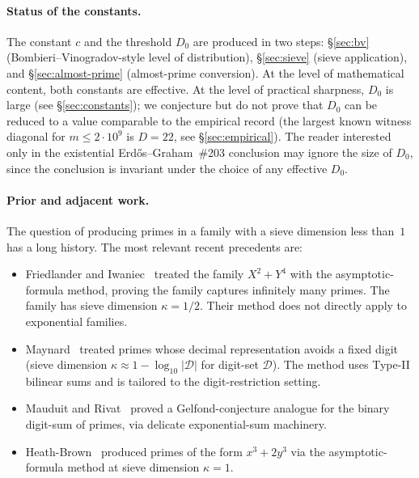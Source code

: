 \paragraph{Status of the constants.}
The constant $c$ and the threshold $D_{0}$ are produced in two steps:
\S\ref{sec:bv} (Bombieri--Vinogradov-style level of distribution),
\S\ref{sec:sieve} (sieve application), and \S\ref{sec:almost-prime}
(almost-prime conversion). At the level of mathematical content, both
constants are effective. At the level of practical sharpness, $D_{0}$
is large (see \S\ref{sec:constants}); we conjecture but do not prove
that $D_{0}$ can be reduced to a value comparable to the empirical
record (the largest known witness diagonal for $m \leq 2 \cdot 10^{9}$ is
$D = 22$, see \S\ref{sec:empirical}). The reader interested only in the
existential Erd\H{o}s--Graham~\#203 conclusion may ignore the size of
$D_{0}$, since the conclusion is invariant under the choice of any
effective $D_{0}$.

\paragraph{Prior and adjacent work.}
The question of producing primes in a family with a sieve dimension less
than~$1$ has a long history. The most relevant recent precedents are:

\begin{itemize}
  \item Friedlander and Iwaniec~\cite{FriedlanderIwaniec1998} treated
    the family $X^{2} + Y^{4}$ with the asymptotic-formula method,
    proving the family captures infinitely many primes. The family has
    sieve dimension $\kappa = 1/2$. Their method does not directly
    apply to exponential families.
  \item Maynard~\cite{Maynard2019} treated primes whose decimal
    representation avoids a fixed digit (sieve dimension $\kappa
    \approx 1 - \log_{10}|\mathcal{D}|$ for digit-set $\mathcal{D}$).
    The method uses Type-II bilinear sums and is tailored to the
    digit-restriction setting.
  \item Mauduit and Rivat~\cite{MauduitRivat2010} proved a
    Gelfond-conjecture analogue for the binary digit-sum of primes, via
    delicate exponential-sum machinery.
  \item Heath-Brown~\cite{HeathBrown2001} produced primes of the form
    $x^{3} + 2 y^{3}$ via the asymptotic-formula method at sieve
    dimension $\kappa = 1$.
\end{itemize}

